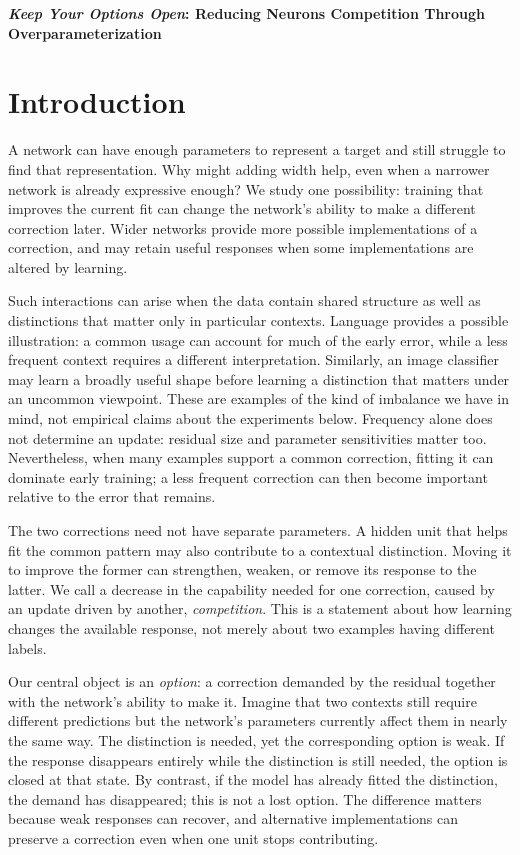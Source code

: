 \documentclass[11pt,a4paper]{article}
\begin{document}
\begin{center}
 {\Large\bfseries \textit{Keep Your Options Open}: Reducing Neurons Competition Through Overparameterization}
\end{center}

\section{Introduction}

A network can have enough parameters to represent a target and still struggle to find that representation. Why might adding width help, even when a narrower network is already expressive enough? We study one possibility: training that improves the current fit can change the network's ability to make a different correction later. Wider networks provide more possible implementations of a correction, and may retain useful responses when some implementations are altered by learning.

Such interactions can arise when the data contain shared structure as well as distinctions that matter only in particular contexts. Language provides a possible illustration: a common usage can account for much of the early error, while a less frequent context requires a different interpretation. Similarly, an image classifier may learn a broadly useful shape before learning a distinction that matters under an uncommon viewpoint. These are examples of the kind of imbalance we have in mind, not empirical claims about the experiments below. Frequency alone does not determine an update: residual size and parameter sensitivities matter too. Nevertheless, when many examples support a common correction, fitting it can dominate early training; a less frequent correction can then become important relative to the error that remains.

The two corrections need not have separate parameters. A hidden unit that helps fit the common pattern may also contribute to a contextual distinction. Moving it to improve the former can strengthen, weaken, or remove its response to the latter. We call a decrease in the capability needed for one correction, caused by an update driven by another, \emph{competition}. This is a statement about how learning changes the available response, not merely about two examples having different labels.

Our central object is an \emph{option}: a correction demanded by the residual together with the network's ability to make it. Imagine that two contexts still require different predictions but the network's parameters currently affect them in nearly the same way. The distinction is needed, yet the corresponding option is weak. If the response disappears entirely while the distinction is still needed, the option is closed at that state. By contrast, if the model has already fitted the distinction, the demand has disappeared; this is not a lost option. The difference matters because weak responses can recover, and alternative implementations can preserve a correction even when one unit stops contributing.
\end{document}
